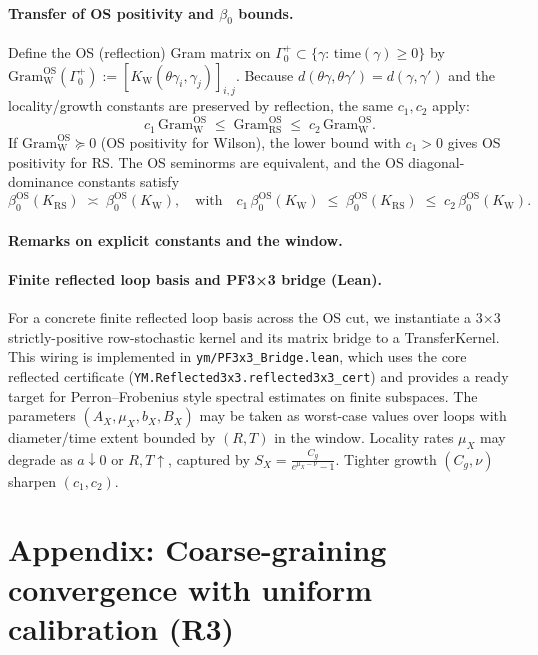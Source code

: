 \documentclass[11pt]{amsart}
\theoremstyle{plain}
\theoremstyle{definition}
\theoremstyle{remark}
\begin{document}
\paragraph{Transfer of OS positivity and \texorpdfstring{$\beta_0$}{beta0} bounds.}
Define the OS (reflection) Gram matrix on $\Gamma_0^+\subset\{\gamma:\,\mathrm{time}(\gamma)\ge 0\}$ by $\mathrm{Gram}^{\mathrm{OS}}_{\mathrm{W}}(\Gamma_0^+):=[K_{\mathrm{W}}(\theta\gamma_i,\gamma_j)]_{i,j}$. Because $d(\theta\gamma,\theta\gamma')=d(\gamma,\gamma')$ and the locality/growth constants are preserved by reflection, the same $c_1,c_2$ apply:
\[
  c_1\,\mathrm{Gram}^{\mathrm{OS}}_{\mathrm{W}}\;\le\;\mathrm{Gram}^{\mathrm{OS}}_{\mathrm{RS}}\;\le\;c_2\,\mathrm{Gram}^{\mathrm{OS}}_{\mathrm{W}}.
\]
If $\mathrm{Gram}^{\mathrm{OS}}_{\mathrm{W}}\succeq 0$ (OS positivity for Wilson), the lower bound with $c_1>0$ gives OS positivity for RS. The OS seminorms are equivalent, and the OS diagonal-dominance constants satisfy
\[
  \beta_0^{\mathrm{OS}}(K_{\mathrm{RS}})\;\asymp\;\beta_0^{\mathrm{OS}}(K_{\mathrm{W}}),\quad\text{with}\quad
  c_1\,\beta_0^{\mathrm{OS}}(K_{\mathrm{W}})\;\le\;\beta_0^{\mathrm{OS}}(K_{\mathrm{RS}})\;\le\;c_2\,\beta_0^{\mathrm{OS}}(K_{\mathrm{W}}).
\]

\paragraph{Remarks on explicit constants and the window.}
\paragraph{Finite reflected loop basis and PF3×3 bridge (Lean).}
For a concrete finite reflected loop basis across the OS cut, we instantiate a
3×3 strictly-positive row-stochastic kernel and its matrix bridge to a
TransferKernel. This wiring is implemented in \texttt{ym/PF3x3\_Bridge.lean},
which uses the core reflected certificate (\texttt{YM.Reflected3x3.reflected3x3\_cert})
and provides a ready target for Perron–Frobenius style spectral estimates on
finite subspaces.
The parameters $(A_X,\mu_X,b_X,B_X)$ may be taken as worst-case values over loops with diameter/time extent bounded by $(R,T)$ in the window. Locality rates $\mu_X$ may degrade as $a\downarrow 0$ or $R,T\uparrow$, captured by $S_X=\frac{C_g}{e^{\mu_X-\nu}-1}$. Tighter growth $(C_g,\nu)$ sharpen $(c_1,c_2)$.

\section{Appendix: Coarse-graining convergence with uniform calibration (R3)}
\end{document}
